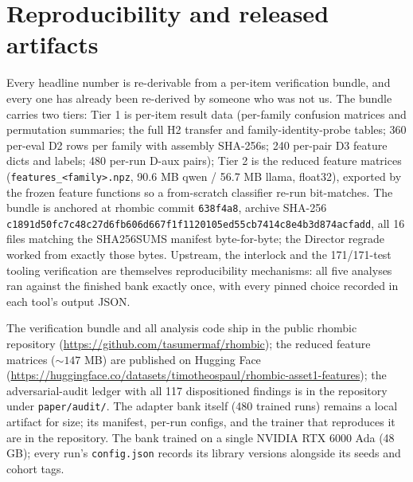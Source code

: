\documentclass[10pt]{article}
\begin{document}
\section{Reproducibility and released artifacts}
\label{sec:repro}

Every headline number is re-derivable from a per-item verification bundle,
and every one has already been re-derived by someone who was not us. The
bundle carries two tiers: Tier 1 is per-item result data (per-family
confusion matrices and permutation summaries; the full H2 transfer and
family-identity-probe tables; 360 per-eval D2 rows per family with
assembly SHA-256s; 240 per-pair D3 feature dicts and labels; 480 per-run
D-aux pairs); Tier 2 is the reduced feature matrices
(\texttt{features\_<family>.npz}, 90.6 MB qwen / 56.7 MB llama, float32),
exported by the frozen feature functions so a from-scratch classifier
re-run bit-matches. The bundle is anchored at rhombic commit
\texttt{638f4a8}, archive SHA-256
{\small\texttt{c1891d50fc7c48c27d6fb606d667f1f1120105ed55cb7414c8e4b3d874acfadd}},
all 16 files matching the SHA256SUMS manifest byte-for-byte; the Director
regrade worked from exactly those bytes. Upstream, the interlock and the
171/171-test tooling verification are themselves reproducibility
mechanisms: all five analyses ran against the finished bank exactly once,
with every pinned choice recorded in each tool's output JSON.

The verification bundle and all analysis code ship in the public rhombic
repository (\url{https://github.com/tasumermaf/rhombic}); the reduced
feature matrices (${\sim}147$ MB) are published on Hugging Face
(\url{https://huggingface.co/datasets/timotheospaul/rhombic-asset1-features});
the adversarial-audit ledger with all 117 dispositioned findings is in the
repository under \texttt{paper/audit/}. The adapter bank itself (480
trained runs) remains a local artifact for size; its manifest, per-run
configs, and the trainer that reproduces it are in the repository. The
bank trained on a single NVIDIA RTX 6000 Ada (48 GB); every run's
\texttt{config.json} records its library versions alongside its seeds and
cohort tags.

\end{document}
